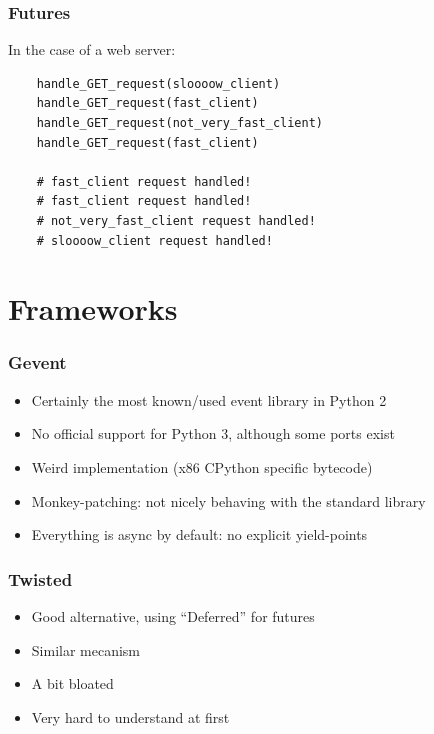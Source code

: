 \documentclass[ignorenonframetext,]{beamer}
\begin{document}
\begin{frame}[fragile]\frametitle{Futures}

In the case of a web server:

\begin{verbatim}
    handle_GET_request(sloooow_client)
    handle_GET_request(fast_client)
    handle_GET_request(not_very_fast_client)
    handle_GET_request(fast_client)

    # fast_client request handled!
    # fast_client request handled!
    # not_very_fast_client request handled!
    # sloooow_client request handled!
\end{verbatim}

\end{frame}

\section{Frameworks}

\begin{frame}[fragile]\frametitle{Gevent}

\begin{itemize}[<+->]
\itemsep1pt\parskip0pt
\item
  Certainly the most known/used event library in Python 2
\item
  No official support for Python 3, although some ports exist
\item
  Weird implementation (x86 CPython specific bytecode)
\item
  Monkey-patching: not nicely behaving with the standard library
\item
  Everything is async by default: no explicit yield-points
\end{itemize}

\end{frame}

\begin{frame}[fragile]\frametitle{Twisted}

\begin{itemize}[<+->]
\itemsep1pt\parskip0pt
\item
  Good alternative, using ``Deferred'' for futures
\item
  Similar mecanism
\item
  A bit bloated
\item
  Very hard to understand at first
\end{itemize}

\end{frame}
\end{document}
